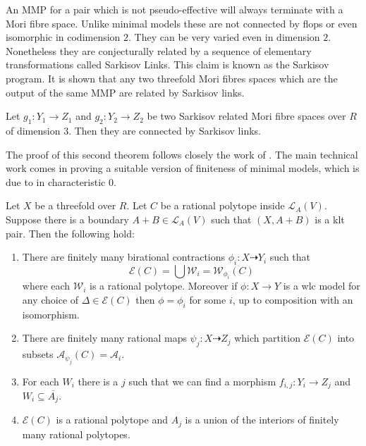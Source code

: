 	An MMP for a pair which is not pseudo-effective will always terminate with a Mori fibre space. Unlike minimal models these are not connected by flops or even isomorphic in codimension $2$. They can be very varied even in dimension $2$. Nonetheless they are conjecturally related by a sequence of elementary transformations called Sarkisov Links. This claim is known as the Sarkisov program. It is shown that any two threefold Mori fibres spaces which are the output of the same MMP are related by Sarkisov links.
	
	\begin{theorem}
		Let $g_{1}:Y_{1} \to Z_{1}$ and $g_{2}:Y_{2} \to Z_{2}$ be two Sarkisov related Mori fibre spaces over $R$ of dimension $3$. Then they are connected by Sarkisov links.
	\end{theorem}
	
	The proof of this second theorem follows closely the work of \cite{hacon2009sarkisov}. The main technical work comes in proving a suitable version of finiteness of minimal models, which is due to \cite{birkar2010existence} in characteristic $0$. 
	
		\begin{theorem}
		Let $X$ be a threefold over $R$. Let $C$ be a rational polytope inside $\mathcal{L}_{A}(V)$. Suppose there is a boundary $A+B \in \mathcal{L}_{A}(V)$ such that $(X,A+B)$ is a klt pair. Then the following hold:
		
		\begin{enumerate}
			\item There are finitely many birational contractions $\phi_{i}:X \dashrightarrow Y_{i}$ such that 
			\[\mathcal{E}(C) = \bigcup \mathcal{W}_{i}=\mathcal{W}_{\phi_{i}}(C)\]
			where each $\mathcal{W}_{i}$ is a rational polytope. Moreover if $\phi:X \to Y$ is a wlc model for any choice of $\Delta \in \mathcal{E}(C)$ then $\phi=\phi_{i}$ for some $i$, up to composition with an isomorphism.
			
			\item There are finitely many rational maps $\psi_{j}:X \dashrightarrow Z_{j}$ which partition $\mathcal{E}(C)$ into subsets $\mathcal{A}_{\psi_{j}}(C)=\mathcal{A}_{i}$.
			\item  For each $W_{i}$ there is a $j$ such that we can find a morphism $f_{i,j}: Y_{i} \to Z_{j}$ and $W_{i} \subseteq \overline{A_{j}}$.
			\item  $\mathcal{E}(C)$ is a rational polytope and $A_{j}$ is a union of the interiors of finitely many rational polytopes.
		\end{enumerate}
	\end{theorem}
	
